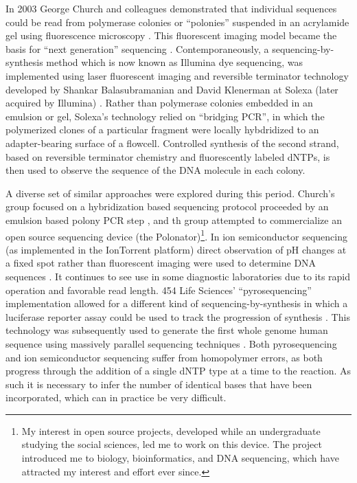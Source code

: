 In 2003 George Church and colleagues demonstrated that individual sequences could be read from polymerase colonies or ``polonies'' suspended in an acrylamide gel using fluorescence microscopy \cite{mitra2003fluorescent}.
This fluorescent imaging model became the basis for ``next generation'' sequencing \cite{shendure2008next}.
Contemporaneously, a sequencing-by-synthesis method which is now known as Illumina dye sequencing, was implemented using laser fluorescent imaging and reversible terminator technology developed by Shankar Balasubramanian and David Klenerman at Solexa (later acquired by Illumina) \cite{balasubramanian2004arrayed, bentley2008accurate}.
Rather than polymerase colonies embedded in an emulsion or gel, Solexa's technology relied on ``bridging PCR'', in which the polymerized clones of a particular fragment were locally hybdridized to an adapter-bearing surface of a flowcell.
Controlled synthesis of the second strand, based on reversible terminator chemistry \cite{canard1994dna} and fluorescently labeled dNTPs, is then used to observe the sequence of the DNA molecule in each colony.

A diverse set of similar approaches were explored during this period.
Church's group focused on a hybridization based sequencing protocol proceeded by an emulsion based polony PCR step \cite{shendure2005accurate}, and th group attempted to commercialize an open source sequencing device (the Polonator)\footnote{My interest in open source projects, developed while an undergraduate studying the social sciences, led me to work on this device. The project introduced me to biology, bioinformatics, and DNA sequencing, which have attracted my interest and effort ever since.}.
In ion semiconductor sequencing (as implemented in the IonTorrent platform) direct observation of pH changes at a fixed spot rather than fluorescent imaging were used to determine DNA sequences \cite{rusk2010torrents}.
It continues to see use in some diagnostic laboratories due to its rapid operation and favorable read length.
454 Life Sciences' ``pyrosequencing'' implementation allowed for a different kind of sequencing-by-synthesis in which a luciferase reporter assay could be used to track the progression of synthesis \cite{margulies2005genome}.
This technology was subsequently used to generate the first whole genome human sequence using massively parallel sequencing techniques \cite{wheeler2008complete}.
Both pyrosequencing and ion semiconductor sequencing suffer from homopolymer errors, as both progress through the addition of a single dNTP type at a time to the reaction.
As such it is necessary to infer the number of identical bases that have been incorporated, which can in practice be very difficult.

